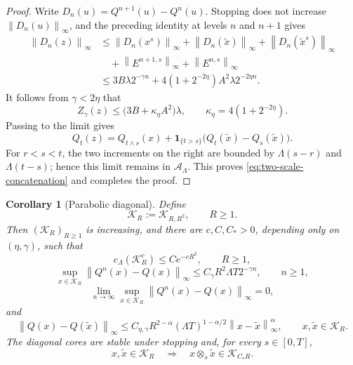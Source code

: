 \documentclass[11pt,reqno]{amsart}
\theoremstyle{plain}
\newtheorem{corollary}[corollary]{Corollary}
\theoremstyle{definition}
\newcommand{\cK}{\mathcal K}
\newcommand{\one}{\mathbf 1}
\newcommand{\norm}[1]{\left\lVert #1\right\rVert}
\begin{document}
\begin{proof}
Write \(D_n(u)=Q^{n+1}(u)-Q^n(u)\).  Stopping does not increase
\(\norm{D_n(u)}_\infty\), and the preceding identity at levels \(n\) and
\(n+1\) gives
\begin{align*}
  \norm{D_n(z)}_\infty
  &\le
  \norm{D_n(x^s)}_\infty
  +\norm{D_n(\widetilde x)}_\infty
  +\norm{D_n(\widetilde x^s)}_\infty \\
  &\quad
  +\norm{E^{n+1,s}}_\infty+\norm{E^{n,s}}_\infty \\
  &\le
  3B\lambda2^{-\gamma n}
  +4(1+2^{-2\eta})A^2\lambda2^{-2\eta n}.
\end{align*}
It follows from \(\gamma<2\eta\) that
\[
  Z_\gamma(z)
  \le \bigl(3B+\kappa_\eta A^2\bigr)\lambda,
  \qquad
  \kappa_\eta=4(1+2^{-2\eta}).
\]
Passing to the limit gives
\[
  Q_t(z)
  =Q_{t\wedge s}(x)
   +\one_{\{t>s\}}
      \bigl(Q_t(\widetilde x)-Q_s(\widetilde x)\bigr).
\]
For \(r<s<t\), the two increments on the right are bounded by
\(\Lambda(s-r)\) and \(\Lambda(t-s)\); hence this limit remains in
\(\mathcal A_\Lambda\).  This proves
\eqref{eq:two-scale-concatenation} and completes the proof.
\end{proof}

\begin{corollary}[Parabolic diagonal]
\label{cor:parabolic-core}
Define
\begin{equation}\label{eq:parabolic-core}
  \cK_R:=\cK_{R,R^2},
  \qquad R\ge1.
\end{equation}
Then \((\cK_R)_{R\ge1}\) is increasing, and there are
\(c,C,C_*>0\), depending only on \((\eta,\gamma)\), such that
\begin{equation}\label{eq:core-capacity-rate}
  c_\Lambda(\cK_R^c)\le Ce^{-cR^2},
  \qquad R\ge1,
\end{equation}
\begin{equation}\label{eq:qv-core-rate}
  \sup_{x\in\cK_R}\norm{Q^n(x)-Q(x)}_\infty
  \le C_\gamma R^2\Lambda T2^{-\gamma n},
  \qquad n\ge1,
\end{equation}
\begin{equation}\label{eq:qv-uniform-on-core}
  \lim_{n\to\infty}
  \sup_{x\in\cK_R}\norm{Q^n(x)-Q(x)}_\infty=0,
\end{equation}
and
\begin{equation}\label{eq:qv-core-modulus}
  \norm{Q(x)-Q(\widetilde x)}_\infty
  \le C_{\eta,\gamma}R^{2-\alpha}
       (\Lambda T)^{1-\alpha/2}
       \norm{x-\widetilde x}_\infty^\alpha,
  \qquad x,\widetilde x\in\cK_R.
\end{equation}
The diagonal cores are stable under stopping and, for every \(s\in[0,T]\),
\begin{equation}\label{eq:core-concatenation}
  x,\widetilde x\in\cK_R
  \quad\Longrightarrow\quad
  x\otimes_s\widetilde x\in\cK_{C_*R}.
\end{equation}
\end{corollary}
\end{document}
